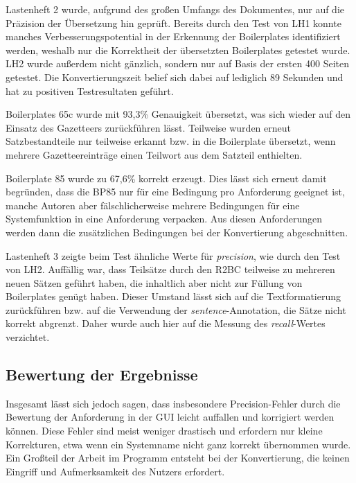 \documentclass[12pt]{report}
\begin{document}
\vspace{12pt}
Lastenheft 2 wurde, aufgrund des großen Umfangs des Dokumentes, nur auf die Präzision der Übersetzung hin geprüft. Bereits durch den Test von LH1 konnte manches Verbesserungspotential in der Erkennung der Boilerplates identifiziert werden, weshalb nur die Korrektheit der übersetzten Boilerplates getestet wurde. LH2 wurde außerdem nicht gänzlich, sondern nur auf Basis der ersten 400 Seiten getestet. Die Konvertierungszeit belief sich dabei auf lediglich 89 Sekunden und hat zu positiven Testresultaten geführt.

Boilerplates 65c wurde mit 93,3\% Genauigkeit übersetzt, was sich wieder auf den Einsatz des Gazetteers zurückführen lässt. Teilweise wurden erneut Satzbestandteile nur teilweise erkannt bzw. in die Boilerplate übersetzt, wenn mehrere Gazetteereinträge einen Teilwort aus dem Satzteil enthielten.

Boilerplate 85 wurde zu 67,6\% korrekt erzeugt. Dies lässt sich erneut damit begründen, dass die BP85 nur für eine Bedingung pro Anforderung geeignet ist, manche Autoren aber fälschlicherweise mehrere Bedingungen für eine Systemfunktion in eine Anforderung verpacken. Aus diesen Anforderungen werden dann die zusätzlichen Bedingungen bei der Konvertierung abgeschnitten.

\vspace{12pt}
Lastenheft 3 zeigte beim Test ähnliche Werte für \textit{precision}, wie durch den Test von LH2. Auffällig war, dass Teilsätze durch den R2BC teilweise zu mehreren neuen Sätzen geführt haben, die inhaltlich aber nicht zur Füllung von Boilerplates genügt haben. Dieser Umstand lässt sich auf die Textformatierung zurückführen bzw. auf die Verwendung der \textit{sentence}-Annotation, die Sätze nicht korrekt abgrenzt. Daher wurde auch hier auf die Messung des \textit{recall}-Wertes verzichtet.

\subsection{Bewertung der Ergebnisse}
Insgesamt lässt sich jedoch sagen, dass insbesondere Precision-Fehler durch die Bewertung der Anforderung in der GUI leicht auffallen und korrigiert werden können. Diese Fehler sind meist weniger drastisch und erfordern nur kleine Korrekturen, etwa wenn ein Systemname nicht ganz korrekt übernommen wurde. Ein Großteil der Arbeit im Programm entsteht bei der Konvertierung, die keinen Eingriff und Aufmerksamkeit des Nutzers erfordert.  
\end{document}
